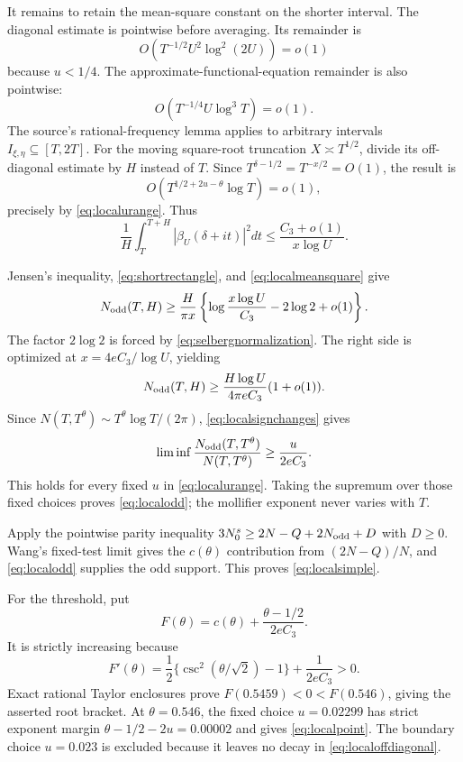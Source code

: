 \documentclass[11pt]{article}
\theoremstyle{remark}
\begin{document}
It remains to retain the mean-square constant on the shorter interval. The
diagonal estimate is pointwise before averaging. Its remainder is
\[
 O(T^{-1/2}U^2\log^2(2U))=o(1)
\]
because $u<1/4$. The approximate-functional-equation remainder is also
pointwise:
\[
 O(T^{-1/4}U\log^3T)=o(1).
\]
The source's rational-frequency lemma applies to arbitrary intervals
$I_{\xi,\eta}\subseteq[T,2T]$. For the moving square-root truncation
$X\asymp T^{1/2}$, divide its off-diagonal estimate by $H$ instead of $T$.
Since $T^{\delta-1/2}=T^{-x/2}=O(1)$, the result is
\begin{equation}\label{eq:localoffdiagonal}
 O\!\left(T^{1/2+2u-\theta}\log T\right)=o(1),
\end{equation}
precisely by \eqref{eq:localurange}. Thus
\begin{equation}\label{eq:localmeansquare}
 \frac1H\int_T^{T+H}|\beta_U(\delta+it)|^2dt
 \le\frac{C_3+o(1)}{x\log U}.
\end{equation}

Jensen's inequality, \eqref{eq:shortrectangle}, and
\eqref{eq:localmeansquare} give
\[
 N_{\rm odd}(T,H)\ge\frac{H}{\pi x}
 \left\{\log\frac{x\log U}{C_3}-2\log2+o(1)\right\}.
\]
The factor $2\log2$ is forced by \eqref{eq:selbergnormalization}. The
right side is optimized at $x=4eC_3/\log U$, yielding
\begin{equation}\label{eq:localsignchanges}
 N_{\rm odd}(T,H)\ge
 \frac{H\log U}{4\pi eC_3}(1+o(1)).
\end{equation}
Since
$N(T,T^\theta)\sim T^\theta\log T/(2\pi)$,
\eqref{eq:localsignchanges} gives
\[
 \liminf\frac{N_{\rm odd}(T,T^\theta)}{N(T,T^\theta)}
 \ge\frac{u}{2eC_3}.
\]
This holds for every fixed $u$ in \eqref{eq:localurange}. Taking the
supremum over those fixed choices proves \eqref{eq:localodd}; the mollifier
exponent never varies with $T$.

Apply the pointwise parity inequality
$3N_0^s\ge2N-Q+2N_{\rm odd}+D$ with $D\ge0$. Wang's fixed-test limit gives
the $c(\theta)$ contribution from $(2N-Q)/N$, and \eqref{eq:localodd}
supplies the odd support. This proves \eqref{eq:localsimple}.

For the threshold, put
\[
 F(\theta)=c(\theta)+\frac{\theta-1/2}{2eC_3}.
\]
It is strictly increasing because
\[
 F'(\theta)=\frac12\{\csc^2(\theta/\sqrt2)-1\}
             +\frac1{2eC_3}>0.
\]
Exact rational Taylor enclosures prove
$F(0.5459)<0<F(0.546)$, giving the asserted root bracket. At
$\theta=0.546$, the fixed choice $u=0.02299$ has strict exponent margin
$\theta-1/2-2u=0.00002$ and gives \eqref{eq:localpoint}. The boundary
choice $u=0.023$ is excluded because it leaves no decay in
\eqref{eq:localoffdiagonal}.
\end{document}
